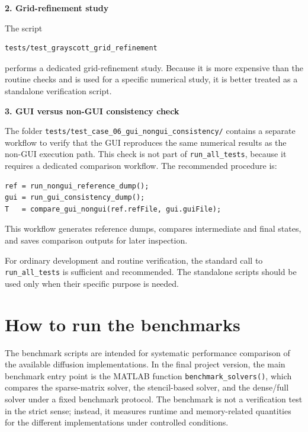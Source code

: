 \medskip

\textbf{2. Grid-refinement study}

The script

\begin{verbatim}
tests/test_grayscott_grid_refinement
\end{verbatim}

performs a dedicated grid-refinement study. Because it is more expensive than the routine checks and is used for a specific numerical study, it is better treated as a standalone verification script.

\medskip

\textbf{3. GUI versus non-GUI consistency check}

The folder \texttt{tests/test\_case\_06\_gui\_nongui\_consistency/} contains a separate workflow to verify that the GUI reproduces the same numerical results as the non-GUI execution path. This check is not part of \texttt{run\_all\_tests}, because it requires a dedicated comparison workflow. The recommended procedure is:

\begin{verbatim}
ref = run_nongui_reference_dump();
gui = run_gui_consistency_dump();
T   = compare_gui_nongui(ref.refFile, gui.guiFile);
\end{verbatim}

This workflow generates reference dumps, compares intermediate and final states, and saves comparison outputs for later inspection.

For ordinary development and routine verification, the standard call to \texttt{run\_all\_tests} is sufficient and recommended. The standalone scripts should be used only when their specific purpose is needed.

\section{How to run the benchmarks}
\label{sec:manual_benchmarks}

The benchmark scripts are intended for systematic performance comparison of the available diffusion implementations. In the final project version, the main benchmark entry point is the MATLAB function \texttt{benchmark\_solvers()}, which compares the sparse-matrix solver, the stencil-based solver, and the dense/full solver under a fixed benchmark protocol. The benchmark is not a verification test in the strict sense; instead, it measures runtime and memory-related quantities for the different implementations under controlled conditions.

